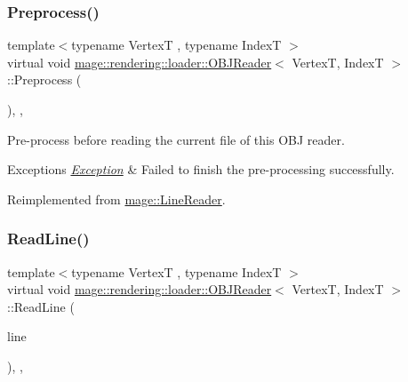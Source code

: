 \subsubsection{\texorpdfstring{Preprocess()}{Preprocess()}}
{\footnotesize\ttfamily template$<$typename VertexT , typename IndexT $>$ \\
virtual void \hyperlink{classmage_1_1rendering_1_1loader_1_1_o_b_j_reader}{mage\+::rendering\+::loader\+::\+O\+B\+J\+Reader}$<$ VertexT, IndexT $>$\+::Preprocess (\begin{DoxyParamCaption}{ }\end{DoxyParamCaption})\hspace{0.3cm}{\ttfamily [override]}, {\ttfamily [private]}, {\ttfamily [virtual]}}

Pre-\/process before reading the current file of this O\+BJ reader.


\begin{DoxyExceptions}{Exceptions}
{\em \hyperlink{classmage_1_1_exception}{Exception}} & Failed to finish the pre-\/processing successfully. \\
\hline
\end{DoxyExceptions}


Reimplemented from \hyperlink{classmage_1_1_line_reader_a4de135cfb0434be786cfcfd7959031ef}{mage\+::\+Line\+Reader}.

\hypertarget{classmage_1_1rendering_1_1loader_1_1_o_b_j_reader_a6552753d2295585283df035732f38dbd}{}\label{classmage_1_1rendering_1_1loader_1_1_o_b_j_reader_a6552753d2295585283df035732f38dbd} 
\subsubsection{\texorpdfstring{Read\+Line()}{ReadLine()}}
{\footnotesize\ttfamily template$<$typename VertexT , typename IndexT $>$ \\
virtual void \hyperlink{classmage_1_1rendering_1_1loader_1_1_o_b_j_reader}{mage\+::rendering\+::loader\+::\+O\+B\+J\+Reader}$<$ VertexT, IndexT $>$\+::Read\+Line (\begin{DoxyParamCaption}\item[{\hyperlink{namespacemage_a8769f9d670d6b585ea306cb1062af94b}{Not\+Null}$<$ \hyperlink{namespacemage_a4163ec9a9a27d5e7f4b452dcb99cb2b9}{zstring} $>$}]{line }\end{DoxyParamCaption})\hspace{0.3cm}{\ttfamily [override]}, {\ttfamily [private]}, {\ttfamily [virtual]}}

